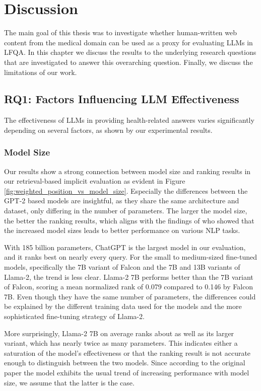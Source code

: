 
\chapter{Discussion}\label{discussion}

The main goal of this thesis was to investigate whether human-written web content from the medical domain can be used as a proxy for evaluating LLMs in LFQA.
In this chapter we discuss the results to the underlying research questions that are investigated to answer this overarching question.
Finally, we discuss the limitations of our work.

\section{RQ1: Factors Influencing LLM Effectiveness}

The effectiveness of LLMs in providing health-related answers varies significantly depending on several factors, as shown by our experimental results.

\subsection{Model Size}
Our results show a strong connection between model size and ranking results in our retrieval-based implicit evaluation as evident in Figure \ref{fig:weighted_position_vs_model_size}. 
Especially the differences between the GPT-2 based models are insightful, as they share the same architecture and dataset, only differing in the number of parameters.
The larger the model size, the better the ranking results, which aligns with the findings of \cite{radford:2019:language} who showed that the increased model sizes leads to better performance on various NLP tasks.

With 185 billion parameters, ChatGPT is the largest model in our evaluation, and it ranks best on nearly every query.
For the small to medium-sized fine-tuned models, specifically the 7B variant of Falcon and the 7B and 13B variants of Llama-2, the trend is less clear.
Llama-2 7B performs better than the 7B variant of Falcon, scoring a mean normalized rank of 0.079 compared to 0.146 by Falcon 7B.
Even though they have the same number of parameters, the differences could be explained by the different training data used for the models and the more sophisticated fine-tuning strategy of Llama-2.

More surprisingly, Llama-2 7B on average ranks about as well as its larger variant, which has nearly twice as many parameters.
This indicates either a saturation of the model's effectiveness or that the ranking result is not accurate enough to distinguish between the two models.
Since according to the original paper \cite{touvron:2023:Llama} the model exhibits the usual trend of increasing performance with model size, we assume that the latter is the case.

